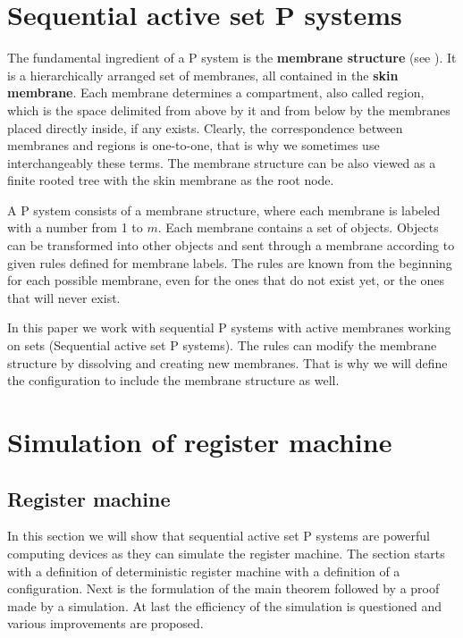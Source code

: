 \documentclass[submission,copyright,creativecommons]{../lib/lncs/llncs}
\begin{document}
  
\section{Sequential active set P systems}
\label{sec:p systems}


The fundamental ingredient of a P system is the {\bf membrane structure} (see \cite{Paun2006Introduction}). It is a hierarchically arranged set of membranes, all contained in the {\bf skin membrane}. Each membrane determines a compartment, also called region, which is the space delimited from above by it and from below by the membranes placed directly inside, if any exists. Clearly, the correspondence between membranes and regions is one-to-one, that is why we sometimes use interchangeably these terms.
The membrane structure can be also viewed as a finite rooted tree with the skin membrane as the root node.

A P system consists of a membrane structure, where each membrane is labeled with a number from 1 to $m$. Each membrane contains a set of objects. Objects can be transformed into other objects and sent through a membrane according to given rules defined for membrane labels. The rules are known from the beginning for each possible membrane, even for the ones that do not exist yet, or the ones that will never exist.

In this paper we work with sequential P systems with active membranes working on sets (Sequential active set P systems). The rules can modify the membrane structure by dissolving and creating new membranes. That is why we will define the configuration to include the membrane structure as well.




\section{Simulation of register machine} %
\label{sec:simulation_of_register_machine}

\subsection{Register machine} %
\label{sub:register_machine}

In this section we will show that sequential active set P systems are powerful computing devices as they can simulate the register machine. The section starts with a definition of deterministic register machine with a definition of a configuration. Next is the formulation of the main theorem followed by a proof made by a simulation. At last the efficiency of the simulation is questioned and various improvements are proposed. 
\end{document}
